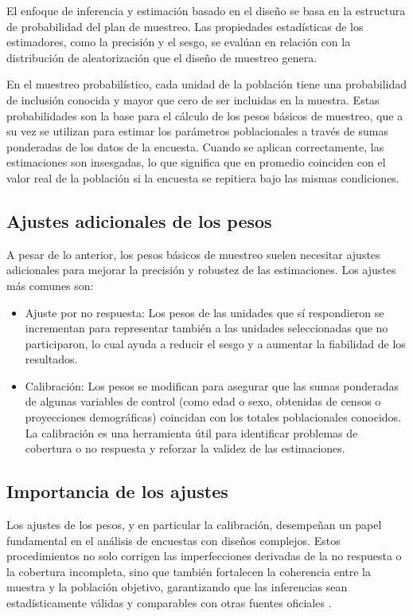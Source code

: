 \documentclass[
  spanish,
  12pt,
]{book}
\providecommand{\tightlist}{%
  \setlength{\itemsep}{0pt}\setlength{\parskip}{0pt}}
\begin{document}
El enfoque de inferencia y estimación basado en el diseño se basa en la estructura de probabilidad del plan de muestreo. Las propiedades estadísticas de los estimadores, como la precisión y el sesgo, se evalúan en relación con la distribución de aleatorización que el diseño de muestreo genera.

En el muestreo probabilístico, cada unidad de la población tiene una probabilidad de inclusión conocida y mayor que cero de ser incluidas en la muestra. Estas probabilidades son la base para el cálculo de los pesos básicos de muestreo, que a su vez se utilizan para estimar los parámetros poblacionales a través de sumas ponderadas de los datos de la encuesta. Cuando se aplican correctamente, las estimaciones son insesgadas, lo que significa que en promedio coinciden con el valor real de la población si la encuesta se repitiera bajo las mismas condiciones.

\subsection{Ajustes adicionales de los pesos}\label{ajustes-adicionales-de-los-pesos}

A pesar de lo anterior, los pesos básicos de muestreo suelen necesitar ajustes adicionales para mejorar la precisión y robustez de las estimaciones. Los ajustes más comunes son:

\begin{itemize}
\tightlist
\item
  Ajuste por no respuesta: Los pesos de las unidades que sí respondieron se incrementan para representar también a las unidades seleccionadas que no participaron, lo cual ayuda a reducir el sesgo y a aumentar la fiabilidad de los resultados.
\item
  Calibración: Los pesos se modifican para asegurar que las sumas ponderadas de algunas variables de control (como edad o sexo, obtenidas de censos o proyecciones demográficas) coincidan con los totales poblacionales conocidos. La calibración es una herramienta útil para identificar problemas de cobertura o no respuesta y reforzar la validez de las estimaciones.
\end{itemize}

\subsection{Importancia de los ajustes}\label{importancia-de-los-ajustes}

Los ajustes de los pesos, y en particular la calibración, desempeñan un papel fundamental en el análisis de encuestas con diseños complejos. Estos procedimientos no solo corrigen las imperfecciones derivadas de la no respuesta o la cobertura incompleta, sino que también fortalecen la coherencia entre la muestra y la población objetivo, garantizando que las inferencias sean estadísticamente válidas y comparables con otras fuentes oficiales \citep{kalton2003weighting}.
\end{document}
